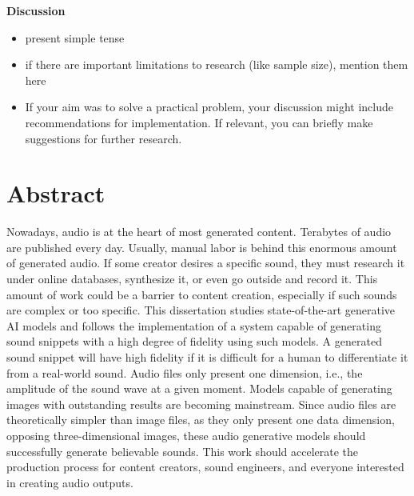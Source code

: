 \textbf{Discussion}

\begin{itemize}
    \item present simple tense
    \item if there are important limitations to research (like sample size), mention them here
    \item If your aim was to solve a practical problem, your discussion might include recommendations for implementation. If relevant, you can briefly make suggestions for further research.
\end{itemize}

\section*{Abstract}

Nowadays, audio is at the heart of most generated content. Terabytes of audio are published every day. Usually, manual labor is behind this enormous amount of generated audio. If some creator desires a specific sound, they must research it under online databases, synthesize it, or even go outside and record it. This amount of work could be a barrier to content creation, especially if such sounds are complex or too specific. This dissertation studies state-of-the-art generative AI models and follows the implementation of a system capable of generating sound snippets with a high degree of fidelity using such models. A generated sound snippet will have high fidelity if it is difficult for a human to differentiate it from a real-world sound. Audio files only present one dimension, i.e., the amplitude of the sound wave at a given moment. Models capable of generating images with outstanding results are becoming mainstream. Since audio files are theoretically simpler than image files, as they only present one data dimension, opposing three-dimensional images, these audio generative models should successfully generate believable sounds. This work should accelerate the production process for content creators, sound engineers, and everyone interested in creating audio outputs.